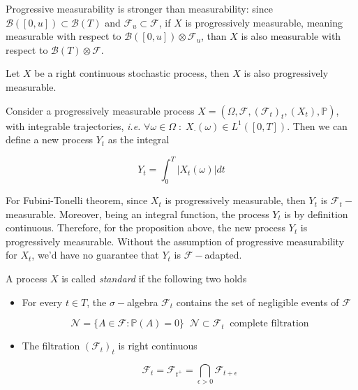 Progressive measurability is stronger than measurability: since $\mathcal{B}([0,u]) \subset \mathcal{B}(T)$ and $\mathcal{F}_u \subset \mathcal{F}$, if $X$ is progressively measurable, meaning measurable with respect to $\mathcal{B}([0,u]) \otimes \mathcal{F}_u$, than $X$ is also measurable with respect to $\mathcal{B}(T) \otimes \mathcal{F}$.

\begin{proposition}
    Let $X$ be a right continuous stochastic process, then $X$ is also progressively measurable. 
\end{proposition}

Consider a progressively measurable process $X = (\Omega, \mathcal{F}, (\mathcal{F}_t)_t, (X_t), \mathbb{P})$, with integrable trajectories, \textit{i.e.} $\forall \omega \in \Omega \; : \; X_{\cdot}(\omega) \in L^1([0,T])$. Then we can define a new process $Y_t$ as the integral 

\begin{equation*}
    Y_t = \int_0^T \big\vert X_t(\omega) \big\vert dt 
\end{equation*}

For Fubini-Tonelli theorem, since $X_t$ is progressively measurable, then $Y_t$ is $\mathcal{F}_t-$measurable. Moreover, being an integral function, the process $Y_t$ is by definition continuous. Therefore, for the proposition above, the new process $Y_t$ is progressively measurable. Without the assumption of progressive measurability for $X_t$, we'd have no guarantee that $Y_t$ is $\mathcal{F}-$adapted. 

\begin{definition}
    A process $X$ is called \textit{standard} if the following two holds
    \begin{itemize}
        \item For every $t \in T$, the $\sigma-$algebra $\mathcal{F}_t$ contains the set of negligible events of $\mathcal{F}$

        \begin{equation*}
            \mathcal{N} = \Big\{ A \in \mathcal{F} : \mathbb{P}(A) = 0 \Big\} \;\; \mathcal{N} \subset \mathcal{F}_t \;\; \text{complete filtration}
        \end{equation*}

        \item The filtration $(\mathcal{F}_t)_t$ is right continuous

        \begin{equation*}
            \mathcal{F}_t = \mathcal{F}_{t^+} = \bigcap_{\epsilon > 0} \mathcal{F}_{t+\epsilon}
        \end{equation*}
    \end{itemize}
\end{definition}

